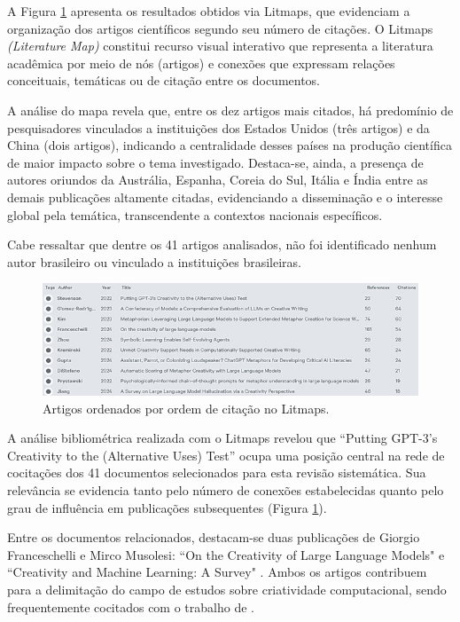 \documentclass[portuguese]{textolivre}
\begin{document}
A Figura \ref{fig-3} apresenta os resultados obtidos via Litmaps, que evidenciam a organização dos artigos científicos segundo seu número de citações. O Litmaps \textit{(Literature Map)} constitui recurso visual interativo que representa a literatura acadêmica por meio de nós (artigos) e conexões que expressam relações conceituais, temáticas ou de citação entre os documentos.

 A análise do mapa revela que, entre os dez artigos mais citados, há predomínio de pesquisadores vinculados a instituições dos Estados Unidos (três artigos) e da China (dois artigos), indicando a centralidade desses países na produção científica de maior impacto sobre o tema investigado.  Destaca-se, ainda, a presença de autores oriundos da Austrália, Espanha, Coreia do Sul, Itália e Índia entre as demais publicações altamente citadas, evidenciando a disseminação e o interesse global pela temática, transcendente a contextos nacionais específicos.

Cabe ressaltar que dentre os 41 artigos analisados, não foi identificado nenhum autor brasileiro ou vinculado a instituições brasileiras.

\begin{figure}[htbp]
\centering
\begin{minipage}{0.90\textwidth}
\includegraphics[width=\textwidth]{Imagens/fig-003.jpg}
\caption{Artigos ordenados por ordem de citação no Litmaps.}
\label{fig-3}
\end{minipage}
\end{figure}

A análise bibliométrica realizada com o Litmaps revelou que “Putting GPT-3's Creativity to the (Alternative Uses) Test” \cite{stevenson2022} ocupa uma posição central na rede de cocitações dos 41 documentos selecionados para esta revisão sistemática. Sua relevância se evidencia tanto pelo número de conexões estabelecidas quanto pelo grau de influência em publicações subsequentes (Figura \ref{fig-3}).

Entre os documentos relacionados, destacam-se duas publicações de Giorgio Franceschelli e Mirco Musolesi: ``On the Creativity of Large Language Models" \citeyear{franceschelli2024} e ``Creativity and Machine Learning: A Survey" \citeyear{franceschelli2021}. Ambos os artigos contribuem para a delimitação do campo de estudos sobre criatividade computacional, sendo frequentemente cocitados com o trabalho de \textcite{stevenson2022}.
\end{document}
